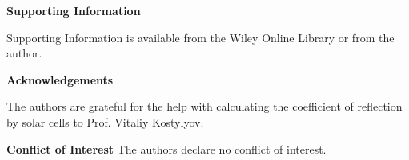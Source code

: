 \documentclass{WileyMSP-template}
\begin{document}
\medskip
\textbf{Supporting Information} \par %
Supporting Information is available from the Wiley Online Library or from the author.



\medskip
\textbf{Acknowledgements} \par %
The authors are grateful for the help with calculating the coefficient of reflection by solar cells to Prof. Vitaliy Kostylyov.

\medskip
\textbf{Conflict of Interest}
The authors declare no conflict of interest.

\medskip








\end{document}
